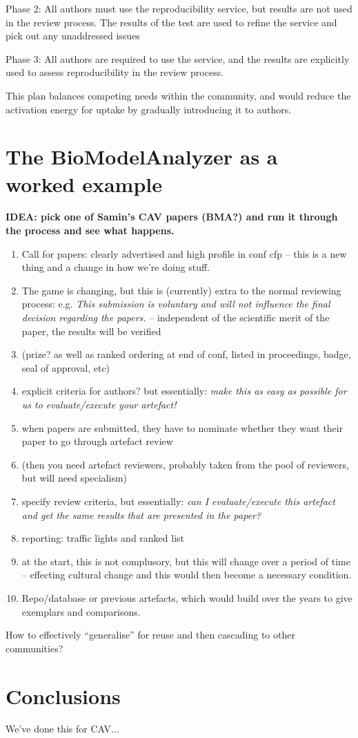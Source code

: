 \documentclass{llncs}
\begin{document}
Phase 2: All authors must use the reproducibility service, but results are not used in the review
process. The results of the test are used to refine the service and pick out any unaddressed issues

Phase 3: All authors are required to use the service, and the results are explicitly used to 
assess reproducibility in the review process.

This plan balances competing needs within the community, and would reduce the activation
energy for uptake by gradually introducing it to authors.

\section{The BioModelAnalyzer as a worked example}\label{example}

{\textbf{IDEA: pick one of Samin's CAV papers (BMA?) and run it through the process
and see what happens.}}


\begin{enumerate}
\item Call for papers: clearly advertised and high profile in conf cfp
  -- this is a new thing and a change in how we're doing stuff.
\item The game is changing, but this is (currently) extra to the
  normal reviewing process: 
e.g. {\emph{This submission is voluntary and will not influence the final decision
regarding the papers.}} -- independent of the scientific merit of the
paper, the results will be verified 
\item (prize? as well as ranked ordering at end of conf, listed in
  proceedings, badge, seal of approval, etc)
\item explicit criteria for authors? but essentially: {\emph{make this
      as easy as possible for us to evaluate/execute your artefact!}}
\item when papers are submitted, they have to nominate whether they
  want their paper to go through artefact review
\item (then you need artefact reviewers, probably taken from the pool of
  reviewers, but will need specialism)
\item specify review criteria, but essentially: {\emph{can I evaluate/execute this
  artefact and get the same results that are presented in the paper?}}
\item reporting: traffic lights and ranked list
\item at the start, this is not complusory, but this will change over a period of
time -- effecting cultural change and this would then become a
necessary condition.
\item Repo/database or previous artefacts, which would build over the
  years to give exemplars and comparisons.
\end{enumerate}

How to effectively ``generalise'' for reuse and then cascading to other communities?

\section{Conclusions}\label{concl}
We've done this for CAV...





\end{document}
